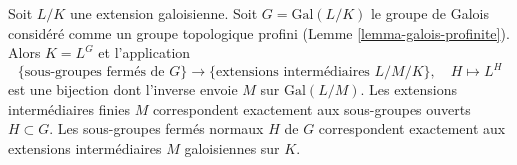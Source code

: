 \begin{theorem}
\label{theorem-inifinite-galois-theory}
Soit $L/K$ une extension galoisienne. Soit $G = \text{Gal}(L/K)$
le groupe de Galois considéré comme un groupe topologique profini
(Lemme \ref{lemma-galois-profinite}). Alors $K = L^G$ et l'application
$$
\{\text{sous-groupes fermés de }G\}
\longrightarrow
\{\text{extensions intermédiaires }L/M/K\},\quad
H \longmapsto L^H
$$
est une bijection dont l'inverse envoie $M$ sur $\text{Gal}(L/M)$.
Les extensions intermédiaires finies $M$ correspondent exactement aux sous-groupes
ouverts $H \subset G$. Les sous-groupes fermés normaux $H$ de $G$
correspondent exactement aux extensions intermédiaires $M$ galoisiennes sur $K$.
\end{theorem}

